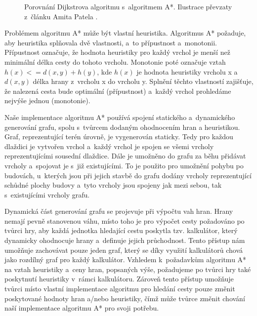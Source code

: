 \begin{figure}[h]
	\centering
	\hfill
	\caption{Porovnání Dijkstrova algoritmu s~algoritmem A*. Ilustrace převzaty z~článku Amita Patela \citep{site:introastar}.}
	\label{fig:astardijkstra}
\end{figure}

Problémem algoritmu A* může být vlastní heuristika. Algoritmus A* požaduje, aby heuristika splňovala dvě vlastnosti, a~to přípustnost a~monotonii. Přípustnost označuje, že hodnota heuristiky pro každý vrchol je menší než minimální délka cesty do tohoto vrcholu. Monotonie poté označuje vztah \(h(x) <= d(x,y) + h(y)\), kde \(h(x)\) je hodnota heuristiky vrcholu x a \(d(x,y)\) délka hrany z~vrcholu x do vrcholu y. Splnění těchto vlastností zajišťuje, že nalezená cesta bude optimální (přípustnost) a~každý vrchol prohledáme nejvýše jednou (monotonie). 

Naše implementace algoritmu A* používá spojení statického a~dynamického generování grafu, spolu s~tvůrcem dodaným ohodnocením hran a heuristikou. Graf, reprezentující terén úrovně, je vygenerován staticky. Tedy pro každou dlaždici je vytvořen vrchol a~každý vrchol je spojen se všemi vrcholy reprezentujícími sousední dlaždice. Dále je umožněno do grafu za běhu přidávat vrcholy a~spojovat je s~již existujícími. To je použito pro umožnění pohybu po budovách, u~kterých jsou při jejich stavbě do grafu dodány vrcholy reprezentující schůdné plochy budovy a~tyto vrcholy jsou spojeny jak mezi sebou, tak s~existujícími vrcholy grafu. 

Dynamická část generování grafu se projevuje při výpočtu vah hran. Hrany nemají pevně stanovenou váhu, místo toho je pro výpočet cesty požadováno po tvůrci hry, aby každá jednotka hledající cestu poskytla tzv. kalkulátor, který dynamicky ohodnocuje hrany a~definuje jejich průchodnost. Tento přístup nám umožňuje zachovávat pouze jeden graf, který se díky využití kalkulátorů chová jako rozdílný graf pro každý kalkulátor. 
Vzhledem k~požadavkům algoritmu A* na vztah heuristiky a~ceny hran, popsaných výše, požadujeme po tvůrci hry také poskytnutí heuristiky v~rámci kalkulátoru. Zároveň tento přístup umožňuje tvůrci místo vlastní implementace algoritmu pro hledání cesty pouze změnit poskytované hodnoty hran a/nebo heuristiky, čímž může tvůrce změnit chování naší implementace algoritmu A* pro svoji potřebu.


